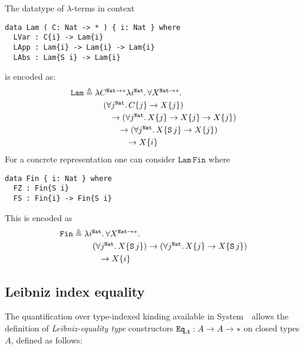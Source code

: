 \begin{example}
The datatype of \mbox{$\lambda$-terms} in context 
\begin{verbatim}
data Lam ( C: Nat -> * ) { i: Nat } where
  LVar : C{i} -> Lam{i}
  LApp : Lam{i} -> Lam{i} -> Lam{i}
  LAbs : Lam{S i} -> Lam{i}
\end{verbatim}
is encoded as:
\[
\mathtt{Lam} \triangleq
\!\!\!
\begin{array}[t]{l}
\lambda C^{\mathtt{Nat}\to*}
\lambda i^\mathtt{Nat}.\,\forall X^{\mathtt{Nat}\to*}.
\\[1mm]
\quad
  (\forall j^\mathtt{Nat}.\,C\{j\} \to X\{j\})
\\[1mm]
\quad\quad
 \to(\forall j^\mathtt{Nat}.\,X\{j\} \to X\{j\} \to X\{j\})
\\[1mm]
\quad\quad\quad
\to(\forall j^\mathtt{Nat}.\,X\{\mathtt S\, j\} \to X\{j\})
\\[1mm]
\quad\quad\quad\quad
  \to X\{i\}
\end{array}
\]
For a concrete representation one can consider
$\mathtt{Lam}\,\mathtt{Fin}$ where
\begin{verbatim}
data Fin { i: Nat } where
  FZ : Fin{S i}
  FS : Fin{i} -> Fin{S i}
\end{verbatim}
This is encoded as
\[
\mathtt{Fin}\triangleq
\!\!\!
\begin{array}[t]{l}
\lambda i^{\mathtt{Nat}}.\,\forall X^{\mathtt{Nat}\to*}.\,
\\[1mm]
\quad 
(\forall j^\mathtt{Nat}.\, X\{\mathtt S\, j\})
	\to (\forall j^\mathtt{Nat}.\, X\{j\}\to X\{\mathtt S\,j\})
\\[1mm]
	\qquad\to X\{i\}
\end{array}
\]
\end{example}
\subsection{Leibniz index equality}
\label{Leibniz}

The quantification over type-indexed kinding available in System~\Fi\
allows the definition of \emph{Leibniz-equality type} constructors
$\mathtt{Eq}_A: A\to A\to *$ on closed types~$A$, defined as follows:

